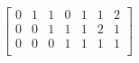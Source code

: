 \documentclass{article}
\begin{document}
 $
\left[
\begin{array}{c|c|c|c|c|c|c}
0 & 1 & 1 & 0 & 1 & 1 & 2 \\
0 & 0 & 1 & 1 & 1 & 2 & 1 \\
0 & 0 & 0 & 1 & 1 & 1 & 1 \\
\end{array}
\right] $
\end{document}
